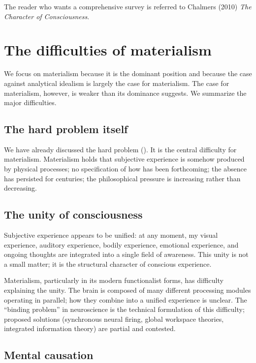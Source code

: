 The reader who wants a comprehensive survey is referred to Chalmers
(2010) \emph{The Character of Consciousness}.

\section{The difficulties of materialism}
\label{sec:materialism-difficulties}

We focus on materialism because it is the dominant position and
because the case against analytical idealism is largely the case for
materialism. The case for materialism, however, is weaker than its
dominance suggests. We summarize the major difficulties.

\subsection{The hard problem itself}

We have already discussed the hard problem ().
It is the central difficulty for materialism. Materialism holds
that subjective experience is somehow produced by physical processes;
no specification of how has been forthcoming; the absence has
persisted for centuries; the philosophical pressure is increasing
rather than decreasing.

\subsection{The unity of consciousness}

Subjective experience appears to be unified: at any moment, my
visual experience, auditory experience, bodily experience, emotional
experience, and ongoing thoughts are integrated into a single field
of awareness. This unity is not a small matter; it is the structural
character of conscious experience.

Materialism, particularly in its modern functionalist forms, has
difficulty explaining the unity. The brain is composed of many
different processing modules operating in parallel; how they combine
into a unified experience is unclear. The ``binding problem'' in
neuroscience is the technical formulation of this difficulty;
proposed solutions (synchronous neural firing, global workspace
theories, integrated information theory) are partial and contested.

\subsection{Mental causation}

